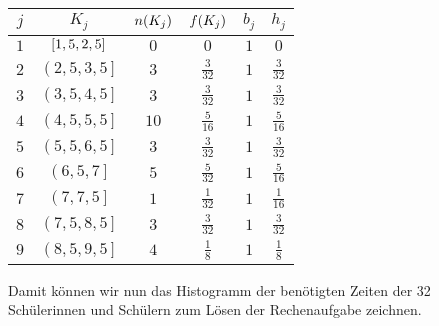 \documentclass{exercise}
\begin{document}
\begin{enumerate}
\begin{center}
\begin{tabular}{cccccc}
                \(j\) & \(K_j\) & \(n\parentheses*{K_j}\) & \(f\parentheses*{K_j}\) & \(b_j\) & \(h_j\)\\
                \midrule
                \(1\) & \(\brackets*{1,5, 2,5}\) & \(0\) & \(0\) & \(1\) & \(0\)\\
                \(2\) & \(\left(2,5, 3,5\right]\) & \(3\) & \(\frac{3}{32}\) & \(1\) & \(\frac{3}{32}\)\\
                \(3\) & \(\left(3,5, 4,5\right]\) & \(3\) & \(\frac{3}{32}\) & \(1\) & \(\frac{3}{32}\)\\
                \(4\) & \(\left(4,5, 5,5\right]\) & \(10\) & \(\frac{5}{16}\) & \(1\) & \(\frac{5}{16}\)\\
                \(5\) & \(\left(5,5, 6,5\right]\) & \(3\) & \(\frac{3}{32}\) & \(1\) & \(\frac{3}{32}\)\\
                \(6\) & \(\left(6,5, 7\right]\) & \(5\) & \(\frac{5}{32}\) & \(1\) & \(\frac{5}{16}\)\\
                \(7\) & \(\left(7, 7,5\right]\) & \(1\) & \(\frac{1}{32}\) & \(1\) & \(\frac{1}{16}\)\\
                \(8\) & \(\left(7,5, 8,5\right]\) & \(3\) & \(\frac{3}{32}\) & \(1\) & \(\frac{3}{32}\)\\
                \(9\) & \(\left(8,5, 9,5\right]\) & \(4\) & \(\frac{1}{8}\) & \(1\) & \(\frac{1}{8}\)\\
                \bottomrule
            \end{tabular}
        \end{center}
        Damit können wir nun das Histogramm der benötigten Zeiten der 32 Schülerinnen und Schülern zum Lösen der Rechenaufgabe zeichnen.
        \begin{center}
        \end{center}
    \end{enumerate}
\end{document}
